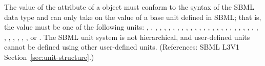 The value of the attribute  of a \Unit object must conform to
the syntax of the SBML data type  and can only take on
the value of a base unit defined in SBML; that is, the value must be one of
the following units:
,
,
,
,
,
,
,
,
,
,
,
,
,
,
,
,
,
,
,
,
,
,
,
,
,
,
,
,
,
,
,
, or
.
The SBML unit system is not hierarchical, and user-defined units cannot be
defined using other user-defined units.  (References: SBML L3V1
Section~\ref{sec:unit-structure}.)
